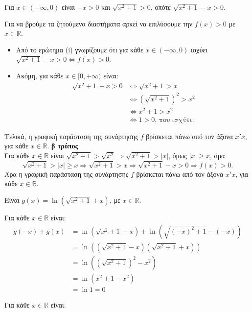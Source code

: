 \documentclass[11pt,a4paper,twoside]{book}
\begin{document}
\begin{alist}
\item 
\begin{rlist}
\item Για $x \in (-\infty, 0)$ είναι $-x > 0$ και $\sqrt{x^2+1} > 0$, οπότε $\sqrt{x^2+1} - x > 0$.
\item Για να βρούμε τα ζητούμενα διαστήματα αρκεί να επιλύσουμε την $f(x) > 0$ με $x \in \mathbb{R}$.
\begin{itemize}
\item Από το ερώτημα (i) γνωρίζουμε ότι για κάθε $x \in (-\infty, 0)$ ισχύει \\
$\sqrt{x^2+1} - x > 0 \Leftrightarrow f(x) > 0$.
\item Ακόμη, για κάθε $x \in [0, +\infty)$ είναι:
\begin{align*}
\sqrt{x^2+1} - x > 0 &\Leftrightarrow \sqrt{x^2+1} > x \\
&\Leftrightarrow \left(\sqrt{x^2+1}\right)^2 > x^2 \\
&\Leftrightarrow x^2 + 1 > x^2 \\
&\Leftrightarrow 1 > 0 \text{, που ισχύει.}
\end{align*}
\end{itemize}
Τελικά, η γραφική παράσταση της συνάρτησης $f$ βρίσκεται πάνω από τον άξονα $x'x$, για κάθε $x \in \mathbb{R}$.
\textbf{β τρόπος} \\
Για κάθε $x \in \mathbb{R}$ είναι $\sqrt{x^2+1} > \sqrt{x^2} \Rightarrow \sqrt{x^2+1} > |x|$, όμως $|x| \ge x$, άρα
\[\sqrt{x^2+1} > |x| \ge x \Rightarrow \sqrt{x^2+1} > x \Rightarrow \sqrt{x^2+1} - x > 0 \Rightarrow f(x) > 0.\]
Άρα η γραφική παράσταση της συνάρτησης $f$ βρίσκεται πάνω από τον άξονα $x'x$, για κάθε $x \in \mathbb{R}$.
\end{rlist}
\item Είναι $g(x) = \ln\left(\sqrt{x^2+1} + x\right)$, με $x \in \mathbb{R}$.
\begin{rlist}
\item Για κάθε $x \in \mathbb{R}$ είναι:
\begin{align*}
g(-x) + g(x) &= \ln\left(\sqrt{x^2+1}-x\right) + \ln\left(\sqrt{(-x)^2+1}-(-x)\right) \\
&= \ln\left(\left(\sqrt{x^2+1}-x\right)\left(\sqrt{x^2+1}+x\right)\right) \\
&= \ln\left(\left(\sqrt{x^2+1}\right)^2 - x^2\right) \\
&= \ln\left(x^2+1-x^2\right) \\
&= \ln 1 = 0
\end{align*}
\item Για κάθε $x \in \mathbb{R}$ είναι:
\end{rlist}
\end{alist}
\end{document}
